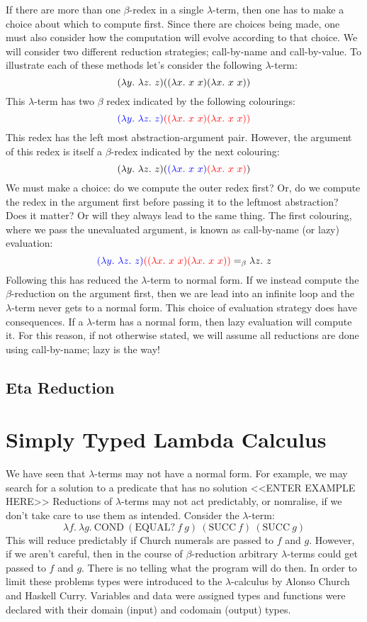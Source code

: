 \documentclass{book}
\begin{document}
    If there are more than one $\beta$-redex in a single $\lambda$-term, then one has to make a choice about which to compute first. Since there are choices being made, one must also consider how the computation will evolve according to that choice. We will consider two different reduction strategies; call-by-name and call-by-value. To illustrate each of these methods let's consider the following $\lambda$-term: 
    $$(\lterm{y}{\lterm{z}{z}})((\lterm{x}{x \ x})(\lterm{x}{x \ x}))$$
    This $\lambda$-term has two $\beta$ redex indicated by the following colourings: 
    $$\textcolor{blue}{(\lambda y. \ \lambda z. \ z)} \textcolor{red}{((\lambda x. \ x \ x)(\lambda x. \ x \ x))}$$
    This redex has the left most abstraction-argument pair. However, the argument of this redex is itself a $\beta$-redex indicated by the next colouring: 
    $$(\lambda y. \ \lambda z. \ z)(\textcolor{blue}{(\lambda x. \ x \ x)} \textcolor{red}{(\lambda x. \ x \ x)})$$
    We must make a choice: do we compute the outer redex first? Or, do we compute the redex in the argument first before passing it to the leftmost abstraction? Does it matter? Or will they always lead to the same thing. The first colouring, where we pass the unevaluated argument, is known as call-by-name (or lazy) evaluation:    
    $$\textcolor{blue}{(\lambda y. \ \lambda z. \ z)} \textcolor{red}{((\lambda x. \ x \ x)(\lambda x. \ x \ x))} =_{\beta} \lambda z. \ z$$Following this has reduced the $\lambda$-term to normal form. If we instead compute the $\beta$-reduction on the argument first, then we are lead into an infinite loop and the $\lambda$-term never gets to a normal form. This choice of evaluation strategy does have consequences. If a $\lambda$-term has a normal form, then lazy evaluation will compute it. For this reason, if not otherwise stated, we will assume all reductions are done using call-by-name; lazy is the way!
                                     
    \subsection*{Eta Reduction}

    \newpage
    \section{Simply Typed Lambda Calculus}

    We have seen that $\lambda$-terms may not have a normal form. For example, we may search for a solution to a predicate that has no solution <<ENTER EXAMPLE HERE>> Reductions of $\lambda$-terms may not act predictably, or nomralise, if we don't take care to use them as intended. Consider the $\lambda$-term: $$\lambda f. \ \lambda g. \ \text{COND} \ (\text{EQUAL?} \ f \ g) \ (\text{SUCC} \ f) \ (\text{SUCC} \ g) $$ This will reduce predictably if Church numerals are passed to $f$ and $g$. However, if we aren't careful, then in the course of $\beta$-reduction arbitrary $\lambda$-terms could get passed to $f$ and $g$. There is no telling what the program will do then. In order to limit these problems types were introduced to the $\lambda$-calculus by Alonso Church and Haskell Curry. Variables and data were assigned types and functions were declared with their domain (input) and codomain (output) types. 
\end{document}
